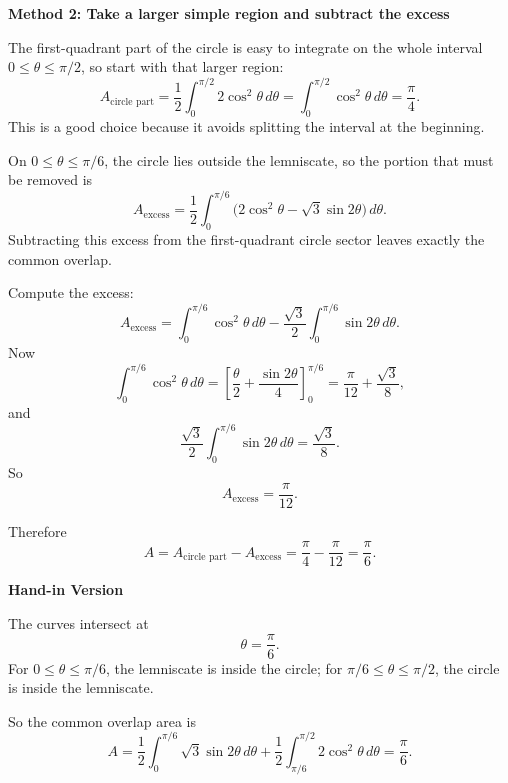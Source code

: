 \documentclass[a4paper,12pt,twocolumn]{article}
\newenvironment{solutionbox}{\begin{framed}}{\end{framed}}
\begin{document}
\begin{solutionbox}
\textbf{Method 2: Take a larger simple region and subtract the excess}

\begin{steps}
\item The first-quadrant part of the circle is easy to integrate on the whole interval \(0\le\theta\le\pi/2\), so start with that larger region:
\[
A_{\text{circle part}}
=\frac12\int_0^{\pi/2}2\cos^2\theta\,d\theta
=\int_0^{\pi/2}\cos^2\theta\,d\theta
=\frac{\pi}{4}.
\]
This is a good choice because it avoids splitting the interval at the beginning.

\item On \(0\le\theta\le\pi/6\), the circle lies outside the lemniscate, so the portion that must be removed is
\[
A_{\text{excess}}
=\frac12\int_0^{\pi/6}\bigl(2\cos^2\theta-\sqrt3\sin 2\theta\bigr)\,d\theta.
\]
Subtracting this excess from the first-quadrant circle sector leaves exactly the common overlap.

\item Compute the excess:
\[
A_{\text{excess}}
=\int_0^{\pi/6}\cos^2\theta\,d\theta
-\frac{\sqrt3}{2}\int_0^{\pi/6}\sin 2\theta\,d\theta.
\]
Now
\[
\int_0^{\pi/6}\cos^2\theta\,d\theta
=\left[\frac{\theta}{2}+\frac{\sin 2\theta}{4}\right]_0^{\pi/6}
=\frac{\pi}{12}+\frac{\sqrt3}{8},
\]
and
\[
\frac{\sqrt3}{2}\int_0^{\pi/6}\sin 2\theta\,d\theta
=\frac{\sqrt3}{8}.
\]
So
\[
A_{\text{excess}}
=\frac{\pi}{12}.
\]

\item Therefore
\[
A=A_{\text{circle part}}-A_{\text{excess}}
=\frac{\pi}{4}-\frac{\pi}{12}
=\frac{\pi}{6}.
\]
\end{steps}
\end{solutionbox}

\begin{solutionbox}
\textbf{Hand-in Version}

The curves intersect at
\[
\theta=\frac{\pi}{6}.
\]
For \(0\le\theta\le\pi/6\), the lemniscate is inside the circle; for \(\pi/6\le\theta\le\pi/2\), the circle is inside the lemniscate.

So the common overlap area is
\[
A=\frac12\int_0^{\pi/6}\sqrt3\sin 2\theta\,d\theta
+\frac12\int_{\pi/6}^{\pi/2}2\cos^2\theta\,d\theta
=\boxed{\frac{\pi}{6}}.
\]
\end{solutionbox}
\end{document}
